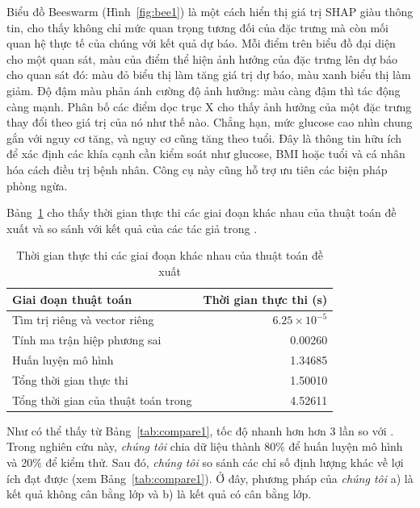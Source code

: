 
Biểu đồ Beeswarm (Hình~\ref{fig:bee1}) là một cách hiển thị giá trị SHAP giàu thông tin, cho thấy không chỉ mức quan trọng tương đối của đặc trưng mà còn mối quan hệ thực tế của chúng với kết quả dự báo. Mỗi điểm trên biểu đồ đại diện cho một quan sát, màu của điểm thể hiện ảnh hưởng của đặc trưng lên dự báo cho quan sát đó: màu đỏ biểu thị làm tăng giá trị dự báo, màu xanh biểu thị làm giảm. Độ đậm màu phản ánh cường độ ảnh hưởng: màu càng đậm thì tác động càng mạnh. Phân bố các điểm dọc trục X cho thấy ảnh hưởng của một đặc trưng thay đổi theo giá trị của nó như thế nào. Chẳng hạn, mức glucose cao nhìn chung gắn với nguy cơ tăng, và nguy cơ cũng tăng theo tuổi. Đây là thông tin hữu ích để xác định các khía cạnh cần kiểm soát như glucose, BMI hoặc tuổi và cá nhân hóa cách điều trị bệnh nhân. Công cụ này cũng hỗ trợ ưu tiên các biện pháp phòng ngừa.


\FloatBarrier

Bảng~\ref{tab:time} cho thấy thời gian thực thi các giai đoạn khác nhau của thuật toán đề xuất và so sánh với kết quả của các tác giả trong .

\begin{table}[H]
\centering
\caption{Thời gian thực thi các giai đoạn khác nhau của thuật toán đề xuất}\label{tab:time}
\begin{tabular}{lr}
\toprule
\textbf{Giai đoạn thuật toán} & \textbf{Thời gian thực thi (s)}\\
\midrule
Tìm trị riêng và vector riêng & $6.25\times 10^{-5}$\\
Tính ma trận hiệp phương sai & 0.00260\\
Huấn luyện mô hình & 1.34685\\
Tổng thời gian thực thi & 1.50010\\
Tổng thời gian của thuật toán trong {21}{21} & 4.52611\\
\bottomrule
\end{tabular}
\end{table}

Như có thể thấy từ Bảng~\ref{tab:compare1}, tốc độ nhanh hơn hơn 3 lần so với . Trong nghiên cứu này, \textit{chúng tôi} chia dữ liệu thành 80\% để huấn luyện mô hình và 20\% để kiểm thử. Sau đó, \textit{chúng tôi} so sánh các chỉ số định lượng khác về lợi ích đạt được (xem Bảng~\ref{tab:compare1}). Ở đây, phương pháp của \textit{chúng tôi} a) là kết quả không cân bằng lớp và b) là kết quả có cân bằng lớp.

